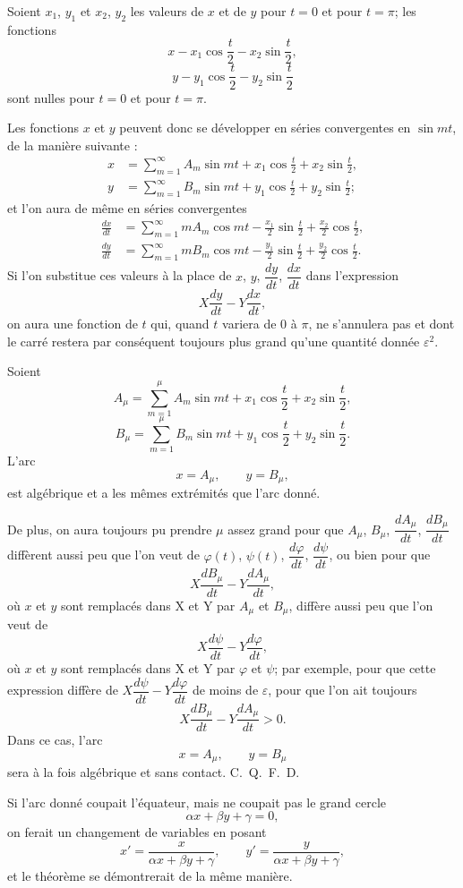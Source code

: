 \documentclass[11pt]{article}
\begin{document}
Soient $x_1$, $y_1$ et $x_2$, $y_2$ les valeurs de $x$ et de $y$ pour $t=0$ et pour $t=\pi$; les fonctions
\[
x-x_1\cos\frac t2-x_2\sin\frac t2,
\]
\[
y-y_1\cos\frac t2-y_2\sin\frac t2
\]
sont nulles pour $t=0$ et pour $t=\pi$.

Les fonctions $x$ et $y$ peuvent donc se développer en séries convergentes en $\sin mt$, de la manière suivante :
\[
\begin{aligned}
x&=\sum_{m=1}^{\infty}A_m\sin mt+x_1\cos\frac t2+x_2\sin\frac t2,\\
y&=\sum_{m=1}^{\infty}B_m\sin mt+y_1\cos\frac t2+y_2\sin\frac t2;
\end{aligned}
\]
et l’on aura de même en séries convergentes
\[
\begin{aligned}
\frac{dx}{dt}&=\sum_{m=1}^{\infty}mA_m\cos mt-\frac{x_1}{2}\sin\frac t2+\frac{x_2}{2}\cos\frac t2,\\
\frac{dy}{dt}&=\sum_{m=1}^{\infty}mB_m\cos mt-\frac{y_1}{2}\sin\frac t2+\frac{y_2}{2}\cos\frac t2.
\end{aligned}
\]
Si l’on substitue ces valeurs à la place de $x$, $y$, $\dfrac{dy}{dt}$, $\dfrac{dx}{dt}$ dans l’expression
\[
X\frac{dy}{dt}-Y\frac{dx}{dt},
\]
on aura une fonction de $t$ qui, quand $t$ variera de $0$ à $\pi$, ne s’annulera pas et dont le carré restera par conséquent toujours plus grand qu’une quantité donnée $\varepsilon^2$.

Soient
\[
A_\mu=\sum_{m=1}^{\mu}A_m\sin mt+x_1\cos\frac t2+x_2\sin\frac t2,
\]
\[
B_\mu=\sum_{m=1}^{\mu}B_m\sin mt+y_1\cos\frac t2+y_2\sin\frac t2.
\]
L’arc
\[
x=A_\mu,
\qquad
 y=B_\mu,
\]
est algébrique et a les mêmes extrémités que l’arc donné.

De plus, on aura toujours pu prendre $\mu$ assez grand pour que $A_\mu$, $B_\mu$, $\dfrac{dA_\mu}{dt}$, $\dfrac{dB_\mu}{dt}$ diffèrent aussi peu que l’on veut de $\varphi(t)$, $\psi(t)$, $\dfrac{d\varphi}{dt}$, $\dfrac{d\psi}{dt}$, ou bien pour que
\[
X\frac{dB_\mu}{dt}-Y\frac{dA_\mu}{dt},
\]
où $x$ et $y$ sont remplacés dans X et Y par $A_\mu$ et $B_\mu$, diffère aussi peu que l’on veut de
\[
X\frac{d\psi}{dt}-Y\frac{d\varphi}{dt},
\]
où $x$ et $y$ sont remplacés dans X et Y par $\varphi$ et $\psi$; par exemple, pour que cette expression diffère de $X\dfrac{d\psi}{dt}-Y\dfrac{d\varphi}{dt}$ de moins de $\varepsilon$, pour que l’on ait toujours
\[
X\frac{dB_\mu}{dt}-Y\frac{dA_\mu}{dt}>0.
\]
Dans ce cas, l’arc
\[
x=A_\mu,
\qquad
 y=B_\mu
\]
sera à la fois algébrique et sans contact. \hfill\mbox{C. Q. F. D.}

Si l’arc donné coupait l’équateur, mais ne coupait pas le grand cercle
\[
\alpha x+\beta y+\gamma=0,
\]
on ferait un changement de variables en posant
\[
x'=\frac{x}{\alpha x+\beta y+\gamma},
\qquad
 y'=\frac{y}{\alpha x+\beta y+\gamma},
\]
et le théorème se démontrerait de la même manière.
\end{document}

